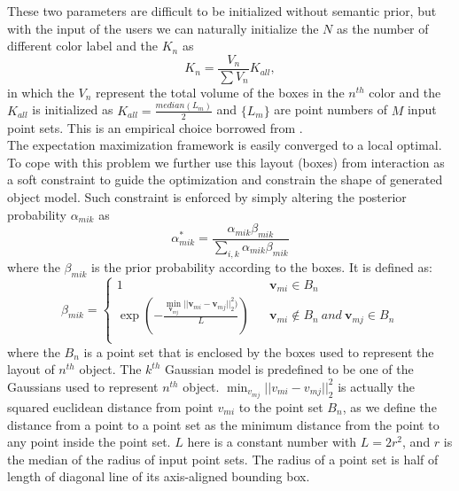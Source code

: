 These two parameters are difficult to be initialized without semantic prior, but with the input of the users we can naturally initialize the $N$ as the number of different color label and the ${K_n}$ as 
\begin{equation}
\label{equ:K_n}
K_n=\frac{V_n}{\sum V_n}K_{all},
\end{equation}
in which the $V_n$ represent the total volume of the boxes in the $n^{th}$ color and the $K_{all}$ is initialized as $K_{all}=\frac{median(L_m)}{2}$ and $\{L_m\}$ are point numbers of $M$ input point sets. This is an empirical choice borrowed from \cite{Evangelidis2014}.\\
%
The expectation maximization framework is easily converged to a local optimal. To cope with this problem we further use this layout (boxes) from interaction as a soft constraint to guide the optimization and constrain the shape of generated object model. Such constraint is enforced by simply altering the posterior probability $\alpha_{mik}$ as
%
\begin{equation}
\label{equ:alteralpha}
\alpha_{mik}^*=\frac{\alpha_{mik}\beta_{mik}}{\sum_{i,k}\alpha_{mik}\beta_{mik}}
\end{equation}
where the $\beta_{mik}$ is the prior probability according to the boxes. It is defined as:
\begin{equation}
\beta_{mik}=\left\{
\begin{array}{rcl}
1& &\pmb v_{mi} \in B_n\\
\exp(-\frac{\min_{\pmb v_{mj}}|| \pmb v_{mi} - \pmb v_{mj} ||_2^2  )}{L})& &\pmb v_{mi} \notin B_n~and~\pmb v_{mj} \in B_n\\
\end{array} \right.
\end{equation}
where the $B_n$ is a point set that is enclosed by the boxes used to represent the layout of $n^{th}$ object. The $k^{th}$ Gaussian model is predefined to be one of the Gaussians used to represent $n^{th}$ object. $\min_{v_{mj}}|| v_{mi} - v_{mj} ||_2^2$ is actually the squared euclidean distance from point $v_{mi}$ to the point set $B_n$, as we define the distance from a point to a point set as the minimum distance from the point to any point inside the point set. $L$ here is a constant number with $L=2r^2$, and $r$ is the median of the radius of input point sets. The radius of a point set is half of length of diagonal line of its axis-aligned bounding box.   

